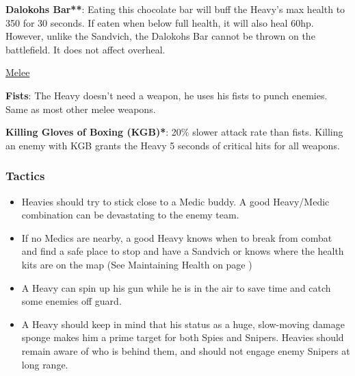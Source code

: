 {\bf Dalokohs Bar**}: Eating this chocolate bar will buff the Heavy's max health to 350 for 30 seconds. If eaten when below full health, it will also heal 60hp. However, unlike the Sandvich, the Dalokohs Bar cannot be thrown on the battlefield. It does not affect overheal.

\newpage

\begin {center}
\underline {Melee}
\end {center}

{\bf Fists}: The Heavy doesn't need a weapon, he uses his fists to punch enemies. Same as most other melee weapons.

{\bf Killing Gloves of Boxing (KGB)*}: 20\% slower attack rate than fists.  Killing an enemy with KGB grants the Heavy 5 seconds of critical hits for all weapons.


\subsubsection {Tactics}
\begin {itemize}

\item Heavies should try to stick close to a Medic buddy. A good Heavy/Medic combination can be devastating to the enemy team. 

\item If no Medics are nearby, a good Heavy knows when to break from combat and find a safe place to stop and have a Sandvich or knows where the health kits are on the map (See Maintaining Health on page \pageref{Maintaining_Health})

\item A Heavy can spin up his gun while he is in the air to save time and catch some enemies off guard.

\item A Heavy should keep in mind that his status as a huge, slow-moving damage sponge makes him a prime target for both Spies and Snipers. Heavies should remain aware of who is behind them, and should not engage enemy Snipers at long range.

\end {itemize}